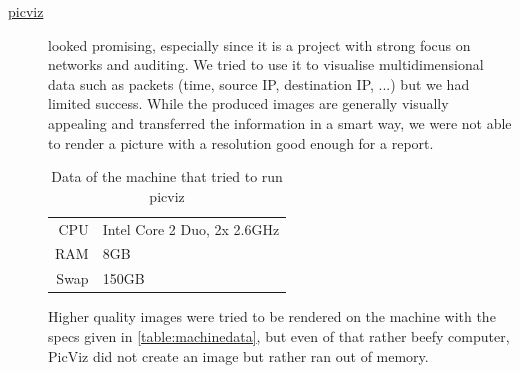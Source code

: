 \documentclass[a4paper,
    11pt,
    normalheadings,
    parindent,
    UKenglish,
    abstracton,
    ]{scrartcl}
\begin{document}
\begin{description}
    \item[\href{http://www.wallinfire.net/picviz/screenshots/index.html}{picviz}]
        looked promising, especially since it is a project with strong focus on networks and auditing.
        We tried to use it to visualise multidimensional data such as packets (time, source IP, destination IP, ...) but we had limited success.
        While the produced images are generally visually appealing and transferred the information in a smart way, we were not able to render a picture with a resolution good enough for a report.
    \begin{table}
        \begin{center}
            \begin{tabular}{r@{: }l}
            \hline
            CPU & Intel Core 2 Duo, 2x 2.6GHz\\
            RAM & 8GB\\
            Swap & 150GB\\\hline
        \end{tabular}
        \end{center}
        \caption{Data of the machine that tried to run picviz}
        \label{table:machinedata}
    \end{table}
        Higher quality images were tried to be rendered on the machine with the specs given in  \autoref{table:machinedata}, but even of that rather beefy computer, PicViz did not create an image but rather ran out of memory.
\end{description}
\end{document}
